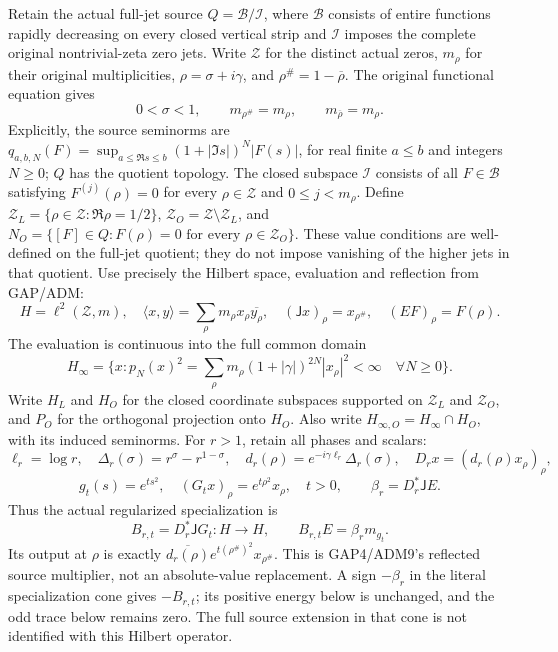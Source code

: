 Retain the actual full-jet source \(Q=\mathcal B/\mathcal I\), where
\(\mathcal B\) consists of entire functions rapidly decreasing on every
closed vertical strip and \(\mathcal I\) imposes the complete original
nontrivial-zeta zero jets. Write \(\mathscr Z\) for the distinct actual
zeros, \(m_\rho\) for their original multiplicities,
\(\rho=\sigma+i\gamma\), and \(\rho^\#=1-\overline\rho\). The original
functional equation gives \[
0<\sigma<1,\qquad m_{\rho^\#}=m_\rho,
\qquad m_{\overline\rho}=m_\rho.
\tag{GDE0.1}
\] Explicitly, the source seminorms are
\(q_{a,b,N}(F)=\sup_{a\le\Re s\le b}(1+|\Im s|)^N|F(s)|\), for real
finite \(a\le b\) and integers \(N\ge0\); \(Q\) has the quotient
topology. The closed subspace \(\mathcal I\) consists of all
\(F\in\mathcal B\) satisfying \(F^{(j)}(\rho)=0\) for every
\(\rho\in\mathscr Z\) and \(0\le j<m_\rho\). Define
\(\mathscr Z_L=\{\rho\in\mathscr Z:\Re\rho=1/2\}\),
\(\mathscr Z_O=\mathscr Z\setminus\mathscr Z_L\), and
\(N_O=\{[F]\in Q:F(\rho)=0\text{ for every }\rho\in\mathscr Z_O\}\).
These value conditions are well-defined on the full-jet quotient; they
do not impose vanishing of the higher jets in that quotient. Use
precisely the Hilbert space, evaluation and reflection from GAP/ADM: \[
H=\ell^2(\mathscr Z,m),\quad
\langle x,y\rangle=\sum_\rho m_\rho x_\rho\overline{y_\rho},
\quad (\mathsf Jx)_\rho=x_{\rho^\#},\quad (EF)_\rho=F(\rho).
\tag{GDE0.2}
\] The evaluation is continuous into the full common domain \[
H_\infty=\{x:p_N(x)^2=\sum_\rho m_\rho(1+|\gamma|)^{2N}|x_\rho|^2<\infty
\quad\forall N\ge0\}.
\tag{GDE0.3}
\] Write \(H_L\) and \(H_O\) for the closed coordinate subspaces
supported on \(\mathscr Z_L\) and \(\mathscr Z_O\), and \(P_O\) for the
orthogonal projection onto \(H_O\). Also write
\(H_{\infty,O}=H_\infty\cap H_O\), with its induced seminorms. For
\(r>1\), retain all phases and scalars: \[
\ell_r=\log r,\quad \Delta_r(\sigma)=r^\sigma-r^{1-\sigma},
\quad d_r(\rho)=e^{-i\gamma\ell_r}\Delta_r(\sigma),
\quad D_rx=(d_r(\rho)x_\rho)_\rho,
\] \[
g_t(s)=e^{ts^2},\quad (G_tx)_\rho=e^{t\rho^2}x_\rho,
\quad t>0,
\qquad \beta_r=D_r^*\mathsf JE.
\tag{GDE0.4}
\] Thus the actual regularized specialization is \[
\boxed{B_{r,t}=D_r^*\mathsf JG_t:H\to H,
\qquad B_{r,t}E=\beta_r m_{g_t}.}
\tag{GDE0.5}
\] Its output at \(\rho\) is exactly
\(\overline{d_r(\rho)}e^{t(\rho^\#)^2}x_{\rho^\#}\). This is GAP4/ADM9's
reflected source multiplier, not an absolute-value replacement. A sign
\(-\beta_r\) in the literal specialization cone gives \(-B_{r,t}\); its
positive energy below is unchanged, and the odd trace below remains
zero. The full source extension in that cone is not identified with this
Hilbert operator.

